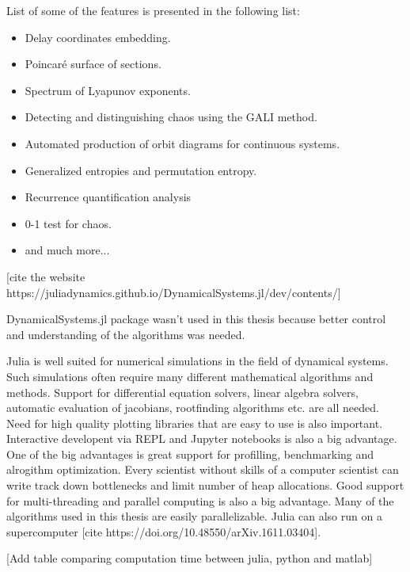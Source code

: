 List of some of the features is presented in the following list:
\begin{itemize}
    \item Delay coordinates embedding.
    \item Poincaré surface of sections.
    \item Spectrum of Lyapunov exponents.
    \item Detecting and distinguishing chaos using the GALI method.
    \item Automated production of orbit diagrams for continuous systems.
    \item Generalized entropies and permutation entropy.
    \item Recurrence quantification analysis
    \item 0-1 test for chaos.
    \item and much more...
\end{itemize} [cite the website https://juliadynamics.github.io/DynamicalSystems.jl/dev/contents/]

DynamicalSystems.jl package wasn't used in this thesis because better control and understanding of the algorithms was needed.
\par
Julia is well suited for numerical simulations in the field of dynamical systems.
Such simulations often require many different mathematical algorithms and methods.
Support for differential equation solvers, linear algebra solvers, automatic evaluation of jacobians, rootfinding algorithms etc. are all needed.
Need for high quality plotting libraries that are easy to use is also important.
Interactive developent via REPL and Jupyter notebooks is also a big advantage.
One of the big advantages is great support for profilling, benchmarking and alrogithm optimization.
Every scientist without skills of a computer scientist can write track down bottlenecks and limit number of heap allocations.
Good support for multi-threading and parallel computing is also a big advantage.
Many of the algorithms used in this thesis are easily parallelizable.
Julia can also run on a supercomputer [cite 
https://doi.org/10.48550/arXiv.1611.03404].

[Add table comparing computation time between julia, python and matlab]

